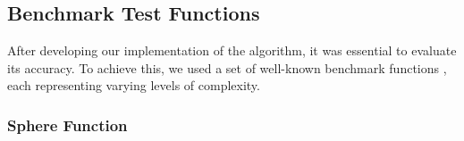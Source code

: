 
            


            
            



  


\subsection{Benchmark Test Functions}
After developing our implementation of the algorithm, it was essential to evaluate its accuracy. To achieve this, we used a set of well-known benchmark functions \cite{simulationlib}, each representing varying levels of complexity.
\subsubsection{Sphere Function}


